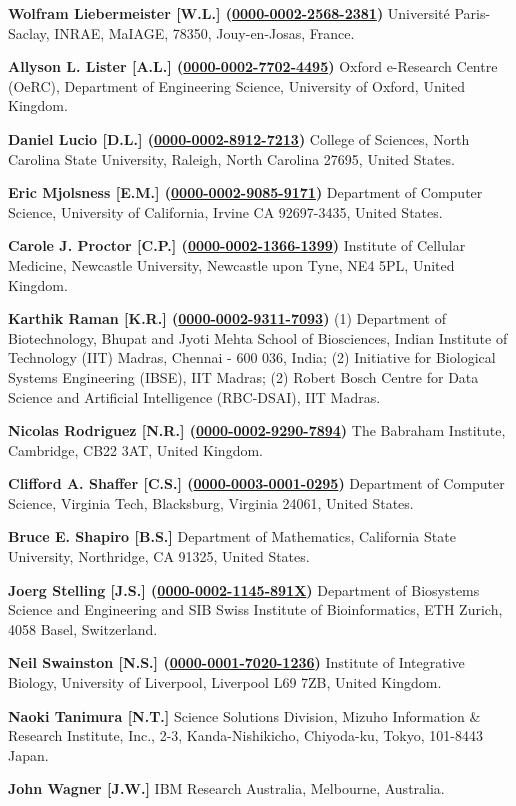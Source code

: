 \documentclass{sbml-paper}
\newcommand{\orcid}[1]{\href{https://orcid.org/#1}{#1}}
\begin{document}
\textbf{Wolfram Liebermeister [W.L.] (\orcid{0000-0002-2568-2381})} Universit\'{e} Paris-Saclay, INRAE, MaIAGE, 78350, Jouy-en-Josas, France.

\textbf{Allyson L. Lister [A.L.] (\orcid{0000-0002-7702-4495})} Oxford e-Research Centre (OeRC), Department of Engineering Science, University of Oxford, United Kingdom.

\textbf{Daniel Lucio [D.L.] (\orcid{0000-0002-8912-7213})} College of Sciences, North Carolina State University, Raleigh, North Carolina 27695, United States.

\textbf{Eric Mjolsness [E.M.] (\orcid{0000-0002-9085-9171})} Department of Computer Science, University of California, Irvine CA 92697-3435, United States.

\textbf{Carole J. Proctor [C.P.] (\orcid{0000-0002-1366-1399})} Institute of Cellular Medicine, Newcastle University, Newcastle upon Tyne, NE4 5PL, United Kingdom.

\textbf{Karthik Raman [K.R.] (\orcid{0000-0002-9311-7093})} (1) Department of Biotechnology, Bhupat and Jyoti Mehta School of Biosciences, Indian Institute of Technology (IIT) Madras, Chennai - 600 036, India; (2) Initiative for Biological Systems Engineering (IBSE), IIT Madras; (2) Robert Bosch Centre for Data Science and Artificial Intelligence (RBC-DSAI), IIT Madras.

\textbf{Nicolas Rodriguez [N.R.] (\orcid{0000-0002-9290-7894})} The Babraham Institute, Cambridge, CB22 3AT, United Kingdom.

\textbf{Clifford A. Shaffer [C.S.] (\orcid{0000-0003-0001-0295})} Department of Computer Science, Virginia Tech, Blacksburg, Virginia 24061, United States.

\textbf{Bruce E. Shapiro [B.S.]} Department of Mathematics, California State University, Northridge, CA 91325, United States.

\textbf{Joerg Stelling [J.S.] (\orcid{0000-0002-1145-891X})} Department of Biosystems Science and Engineering and SIB Swiss Institute of Bioinformatics, ETH Zurich, 4058 Basel, Switzerland.

\textbf{Neil Swainston [N.S.] (\orcid{0000-0001-7020-1236})} Institute of Integrative Biology, University of Liverpool, Liverpool L69 7ZB, United Kingdom.

\textbf{Naoki Tanimura [N.T.]} Science Solutions Division, Mizuho Information \& Research Institute, Inc., 2-3, Kanda-Nishikicho, Chiyoda-ku, Tokyo, 101-8443 Japan.

\textbf{John Wagner [J.W.]} IBM Research Australia, Melbourne, Australia.
\end{document}

